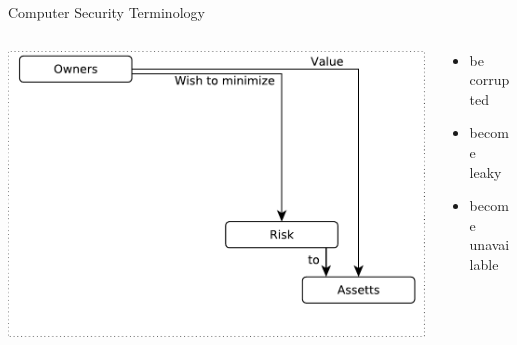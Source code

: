 \documentclass{beamer}
\begin{document}
\begin{frame}{Computer Security Terminology}
\begin{columns}[onlytextwidth]
    \begin{column}{0.6\textwidth}
\includegraphics[width=1\linewidth]{term-2}
  \end{column}
    \begin{column}{0.4\textwidth}
  \begin{itemize}
  \item be corrupted
  \item become leaky
  \item become unavailable
  \end{itemize}
  \end{column}
\end{columns}
\end{frame}
\end{document}

